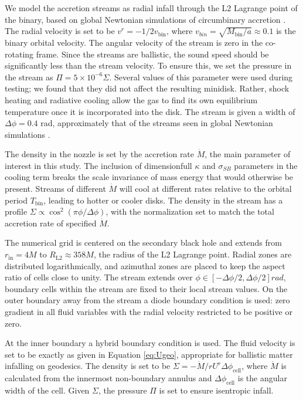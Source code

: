 \documentclass{emulateapj}
\newcommand{\De}{\Delta}
\newcommand{\sig}{\sigma}
\newcommand{\Sig}{\Sigma}
\newcommand{\ka}{\kappa}
\begin{document}
We model the accretion streams as radial infall through the L2 Lagrange point of the binary, based on global Newtonian simulations of circumbinary accretion \citep{Farris14, Farris15A, Farris15B, DOrazio12, DOrazio16}.  The radial velocity is set to be $v^r = -1/2 v_\text{bin}$, where $v_{bin} = \sqrt{M_\text{bin}/a} \approx 0.1$ is the binary orbital velocity.  The angular velocity of the stream is zero in the co-rotating frame.  Since the streams are ballistic, the sound speed should be significantly less than the stream velocity.  To ensure this, we set the pressure in the stream as $\Pi = 5 \times 10^{-6} \Sig$.  Several values of this parameter were used during testing; we found that they did not affect the resulting minidisk. Rather, shock heating and radiative cooling allow the gas to find its own equilibrium temperature once it is incorporated into the disk.  The stream is given a width of $ \De \phi = 0.4$ rad, approximately that of the streams seen in global Newtonian simulations \cite{Farris14}.

The density in the nozzle is set by the accretion rate $\dot{M}$, the main parameter of interest in this study.  The inclusion of dimensionfull $\ka$ and $\sig_{SB}$ parameters in the cooling term breaks the scale invariance of mass energy that would otherwise be present.  Streams of different $\dot{M}$ will cool at different rates relative to the orbital period $T_{\text{bin}}$, leading to hotter or cooler disks.  The density in the stream has a profile $\Sig \propto \cos^2(\pi \phi / \De \phi)$, with the normalization set to match the total accretion rate of specified $\dot{M}$.

The numerical grid is centered on the secondary black hole and extends from $r_\text{in} = 4 M$ to $R_\text{L2} \approx 358 M$, the radius of the L2 Lagrange point. Radial zones are distributed logarithmically, and azimuthal zones are placed to keep the aspect ratio of cells close to unity. The stream extends over $\phi \in [-\De \phi / 2, \De \phi / 2] rad$, boundary cells within the stream are fixed to their local stream values. On the outer boundary away from the stream a diode boundary condition is used: zero gradient in all fluid variables with the radial velocity restricted to be positive or zero.

At the inner boundary a hybrid boundary condition is used.  The fluid velocity is set to be exactly as given in Equation \eqref{eq:Ugeo}, appropriate for ballistic matter infalling on geodesics.  The density is set to be $\Sig = -\dot{M} / r U^r \De \phi_\text{cell}$, where $\dot{M}$ is calculated from the innermost non-boundary annulus and $\De \phi_\text{cell}$ is the angular width of the cell.  Given $\Sig$, the pressure $\Pi$ is set to ensure isentropic infall.
\end{document}
